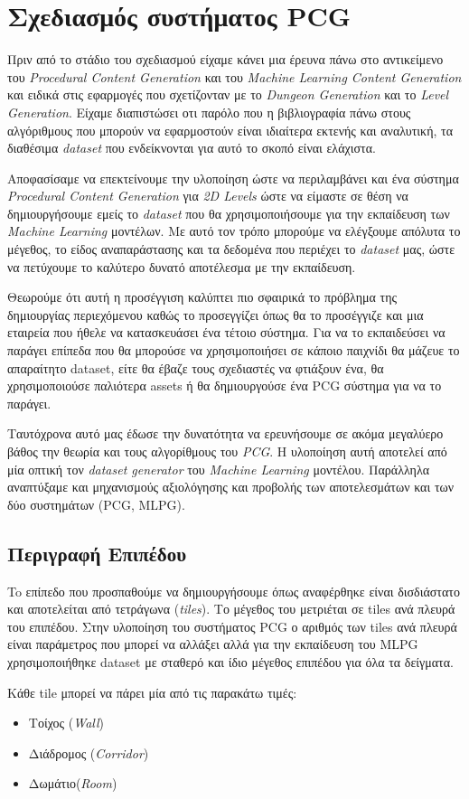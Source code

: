 \section{Σχεδιασμός συστήματος PCG}
Πριν από το στάδιο του σχεδιασμού είχαμε κάνει μια έρευνα πάνω στο αντικείμενο του \textit{Procedural Content Generation} και του  \textit{Machine Learning Content Generation} και ειδικά στις εφαρμογές που σχετίζονταν με το \textit{Dungeon Generation} και το \textit{Level Generation}. Είχαμε διαπιστώσει οτι παρόλο που η βιβλιογραφία πάνω στους αλγόριθμους που μπορούν να εφαρμοστούν είναι ιδιαίτερα εκτενής και αναλυτική, τα διαθέσιμα \textit{dataset} που ενδείκνονται για αυτό το σκοπό είναι ελάχιστα.
\par
Αποφασίσαμε να επεκτείνουμε την υλοποίηση ώστε να περιλαμβάνει και ένα σύστημα \textit{Procedural Content Generation} για \textit{2D Levels} ώστε να είμαστε σε θέση να δημιουργήσουμε εμείς το \textit{dataset} που θα χρησιμοποιήσουμε για την εκπαίδευση των \textit{Machine Learning} μοντέλων. Με αυτό τον τρόπο μπορούμε να ελέγξουμε απόλυτα το μέγεθος, το είδος αναπαράστασης και τα δεδομένα που περιέχει το \textit{dataset} μας, ώστε να πετύχουμε το καλύτερο δυνατό αποτέλεσμα με την εκπαίδευση.
\par
Θεωρούμε ότι αυτή η προσέγγιση καλύπτει πιο σφαιρικά το πρόβλημα της δημιουργίας περιεχόμενου καθώς το προσεγγίζει όπως θα το προσέγγιζε και μια εταιρεία που ήθελε να κατασκευάσει ένα τέτοιο σύστημα. Για να το εκπαιδεύσει να παράγει επίπεδα που θα μπορούσε να χρησιμοποιήσει σε κάποιο παιχνίδι θα μάζευε το απαραίτητο dataset, είτε θα έβαζε τους σχεδιαστές να φτιάξουν ένα, θα χρησιμοποιούσε παλιότερα assets ή θα δημιουργούσε ένα PCG σύστημα για να το παράγει.
\par
Ταυτόχρονα αυτό μας έδωσε την δυνατότητα να ερευνήσουμε σε ακόμα μεγαλύερο βάθος την θεωρία και τους αλγορίθμους του \textit{PCG}. Η υλοποίηση αυτή αποτελεί από μία οπτική τον \textit{dataset generator} του \textit{Machine Learning} μοντέλου. Παράλληλα αναπτύξαμε και μηχανισμούς αξιολόγησης και προβολής των αποτελεσμάτων και των δύο συστημάτων (PCG, MLPG).


\subsection{Περιγραφή Επιπέδου}
To επίπεδο που προσπαθούμε να δημιουργήσουμε όπως αναφέρθηκε είναι δισδιάστατο και αποτελείται από τετράγωνα (\textit{tiles}). Το μέγεθος του μετριέται σε tiles ανά πλευρά του επιπέδου. Στην υλοποίηση του συστήματος PCG ο αριθμός των tiles ανά πλευρά είναι παράμετρος που μπορεί να αλλάξει αλλά για την εκπαίδευση του MLPG χρησιμοποιήθηκε dataset με σταθερό και ίδιο μέγεθος επιπέδου για όλα τα δείγματα.
\par
Κάθε tile μπορεί να πάρει μία από τις παρακάτω τιμές:
\begin{itemize}
\item Τοίχος (\textit{Wall})
\item Διάδρομος (\textit{Corridor})
\item Δωμάτιο(\textit{Room})
\end{itemize}

